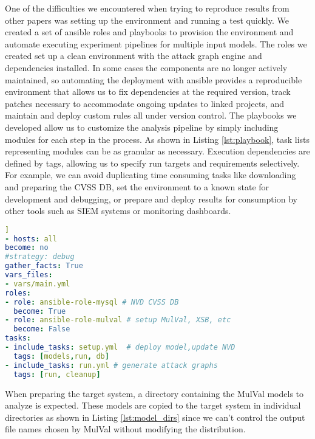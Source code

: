 One of the difficulties we encountered when trying to reproduce results from other papers was setting up the environment and running a test quickly. We created a set of ansible\cite{Hall:2013:ACM:2601666} roles and playbooks to provision the environment and automate executing experiment pipelines for multiple input models. The roles we created set up a clean environment with the attack graph engine and dependencies installed. In some cases the components are no longer actively maintained, so automating the deployment with ansible provides a reproducible environment that allows us to fix dependencies at the required version, track patches necessary to accommodate ongoing updates to linked projects, and maintain and deploy custom rules all under version control. The playbooks we developed allow us to customize the analysis pipeline by simply including modules for each step in the process. As shown in Listing \ref{lst:playbook}, task lists representing modules can be as granular as necessary. Execution dependencies are defined by tags, allowing us to specify run targets and requirements selectively. For example, we can avoid duplicating time consuming tasks like downloading and preparing the CVSS DB, set the environment to a known state for development and debugging, or prepare and deploy results for consumption by other tools such as SIEM systems or monitoring dashboards. 


\begin{minipage}{.95\linewidth}
\begin{lstlisting}[language=yaml, label={lst:playbook}, caption={Ansible CSAF play},captionpos=b,]]
- hosts: all
become: no
#strategy: debug
gather_facts: True
vars_files:
- vars/main.yml
roles:
- role: ansible-role-mysql # NVD CVSS DB
  become: True
- role: ansible-role-mulval # setup MulVal, XSB, etc
  become: False
tasks:
- include_tasks: setup.yml  # deploy model,update NVD
  tags: [models,run, db]
- include_tasks: run.yml # generate attack graphs
  tags: [run, cleanup]
\end{lstlisting}
\end{minipage}

When preparing the target system, a directory containing the MulVal models to analyze is expected. These models are copied to the target system in individual directories as shown in Listing \ref{lst:model_dirs} since we can't control the output file names chosen by MulVal without modifying the distribution. 

